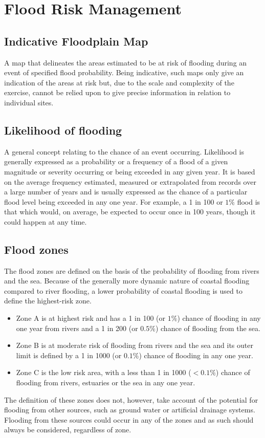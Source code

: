 \section{Flood Risk Management}
\subsection{Indicative Floodplain Map}

A map that delineates the areas estimated to be at risk of flooding during an event of specified flood
probability. Being indicative, such maps only give an indication of the areas at risk but, due to the scale and
complexity of the exercise, cannot be relied upon to give precise information in relation to individual sites.

\subsection{ Likelihood of flooding}
A general concept relating to the chance of an event occurring. Likelihood is generally expressed as a probability or a frequency of a flood of a given
magnitude or severity occurring or being exceeded in any given year. It is based on the average frequency estimated, measured or extrapolated from records over a large number of years and is usually expressed as the chance of a particular flood level being exceeded
in any one year. For example, a 1 in 100 or $1\%$ flood is that which would, on average, be expected to occur
once in 100 years, though it could happen at any time.

\subsection{ Flood zones}

The flood zones are defined on the basis of the probability of flooding from
rivers and the sea. Because of the generally more dynamic nature of coastal
flooding compared to river flooding, a lower probability of coastal flooding is
used to define the highest-risk zone.
\begin{itemize}
\item Zone A is at highest risk and has a 1 in 100 (or $1\%$) chance of flooding in any
one year from rivers and a 1 in 200 (or $0.5\%$) chance of flooding from the
sea.
\item Zone B is at moderate risk of flooding from rivers and the sea and its outer limit
is defined by a 1 in 1000 (or $0.1\%$) chance of flooding in any one year.
\item Zone C is the low risk area, with a less than 1 in 1000 ($<0.1\%$) chance of
flooding from rivers, estuaries or the sea in any one year.
\end{itemize}
The definition of these zones does not, however, take account of the potential
for flooding from other sources, such as ground water or artificial drainage
systems. Flooding from these sources could occur in any of the zones and as
such should always be considered, regardless of zone.

